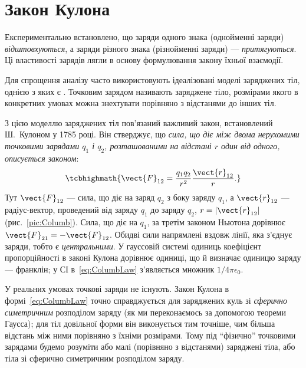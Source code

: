 \section{Закон Кулона}\hypertarget{coulombs-law}{}


Експериментально встановлено, що заряди одного знака (однойменні заряди)
\emph{відштовхуються}, а заряди різного знака (різнойменні заряди) ---
\emph{притягуються}. Ці властивості зарядів лягли в основу формулювання закону їхньої
взаємодії.


Для спрощення аналізу часто використовують ідеалізовані моделі заряджених тіл, однією з
яких є . Точковим зарядом
називають заряджене тіло, розмірами якого в конкретних умовах можна знехтувати порівняно з
відстанями до інших тіл.

З цією моделлю заряджених тіл пов'язаний важливий закон, встановлений Ш.~Кулоном у 1785
році. Він стверджує, що \emph{сила, що діє між двома нерухомими точковими зарядами $q_1$
і $q_2$, розташованими на відстані $r$ один від одного, описується законом}:
\begin{equation}\label{eq:ColumbLaw}
	\tcbhighmath{ \vect{F}_{12} = \frac{q_1 q_2}{r^2}\frac{\vect{r}_{12}}{r}. }
\end{equation}
Тут $\vect{F}_{12}$ --- сила, що діє на заряд $q_2$ з боку заряду $q_1$, а
$\vect{r}_{12}$ --- радіус-вектор, проведений від заряду $q_1$ до заряду $q_2$,
$r = |\vect{r}_{12}|$ (рис.~\ref{pic:Columb}). Сила, що діє на $q_1$, за третім законом Ньютона дорівнює
$\vect{F}_{21} = -\vect{F}_{12}$. Обидві сили напрямлені вздовж лінії, яка з'єднує
заряди, тобто є \emph{центральними}. У гауссовій системі одиниць коефіцієнт пропорційності
в законі Кулона дорівнює одиниці, що й визначає одиницю заряду --- франклін; у СІ
в~\eqref{eq:ColumbLaw} з'являється множник $1/4\pi\epsilon_0$.
\begin{Attention}
	У реальних умовах точкові заряди не існують. Закон Кулона в
	формі~\eqref{eq:ColumbLaw} точно справджується для заряджених куль зі
	\emph{сферично симетричним} розподілом заряду (як ми переконаємось за допомогою
	теореми Гаусса); для тіл довільної форми він виконується тим точніше, чим більша
	відстань між ними порівняно з їхніми розмірами. Тому під \enquote{фізично} точковими
	зарядами будемо розуміти або малі (порівняно з відстанями) заряджені тіла, або тіла зі
	сферично симетричним розподілом заряду.
\end{Attention}

